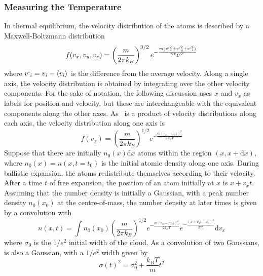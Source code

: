 \subsubsection{Measuring the Temperature}
In thermal equilibrium, the velocity distribution of the atoms is described by a Maxwell-Boltzmann distribution
\begin{equation}
    f(v_x,v_y,v_z) = \left(\frac{m}{2\pi k_B }\right)^{3/2}e^{-\frac{m (v`_x^2+v`_y^2+v`_z^2)}{2 k_B T}}
    \label{eg:mb3D}
\end{equation}
where \(v`_i = v_i - \langle v_i \rangle\) is the difference from the average velocity. Along a single axis, the velocity distribution is obtained by integrating over the other velocity components. For the sake of notation, the following discussion uses \(x\) and \(v_x\) as labels for position and velocity, but these are interchangeable with the equivalent components along the other axes. As~ is a product of velocity distributions along each axis, the velocity distribution along one axis is 
\begin{equation}
    f(v_x) = \left(\frac{m}{2\pi k_B }\right)^{1/2}e^{-\frac{m (v_x-\langle v_x \rangle) ^2}{2 k_B T}}
    \label{eg:mb1D}
\end{equation}
Suppose that there are initially \(n_0 (x) \mathrm{d}x\) atoms within the region \((x, x+\mathrm{d}x)\), where \(n_0(x) = n(x, t=t_0)\) is the initial atomic density along one axis. During ballistic expansion, the atoms redistribute themselves according to their velocity. After a time \(t\) of free expansion, the position of an atom initially at \(x\) is \(x + v_x t\). 
Assuming that the number density is initially a Gaussian, with a peak number density \(n_0(x_0)\) at the centre-of-mass, the number density at later times is given by a convolution with~
\begin{equation}
        n(x,t) = \int n_0(x_0) \left(\frac{m}{2\pi k_B}\right)^{1/2} e^{-\frac{m (v_x-\langle v_x \rangle)^2}{2 k_B T}} e^{-\frac{(x+v_x t - x_0)^2}{2\sigma_0^2}} \mathrm{d}v_x
        \label{eq:density_time}
\end{equation}
where \(\sigma_0\) is the \(1/e^2\) initial width of the cloud. As a convolution of two Gaussians,  is also a Gaussian, with a \(1/e^2\) width given by
\begin{equation}
    \sigma(t)^2 = \sigma_0^2 + \frac{k_B T}{m} t^2
    \label{eq:expansion_width}
\end{equation}
\par\noindent
